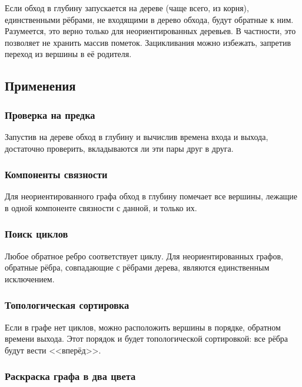 \documentclass[a4paper,12pt]{article}
\begin{document}
      Если обход в глубину запускается на дереве (чаще всего, из корня),
      единственными рёбрами, не входящими в дерево обхода, будут обратные
      к ним. Разумеется, это верно только для неориентированных деревьев.
      В частности, это позволяет не хранить массив пометок. Зацикливания
      можно избежать, запретив переход из вершины в её родителя.

    \subsection{Применения}

      \subsubsection{Проверка на предка}

      Запустив на дереве обход в глубину и вычислив времена входа и выхода,
      достаточно проверить, вкладываются ли эти пары друг в друга.

      \subsubsection{Компоненты связности}

      Для неориентированного графа обход в глубину помечает все вершины,
      лежащие в одной компоненте связности с данной, и только их.
      
      \subsubsection{Поиск циклов}

      Любое обратное ребро соответствует циклу. Для неориентированных
      графов, обратные рёбра, совпадающие с рёбрами дерева, являются
      единственным исключением.
      
      \subsubsection{Топологическая сортировка}

      Если в графе нет циклов, можно расположить вершины в порядке,
      обратном времени выхода. Этот порядок и будет топологической
      сортировкой: все рёбра будут вести <<вперёд>>.

      \subsubsection{Раскраска графа в два цвета}
\end{document}
